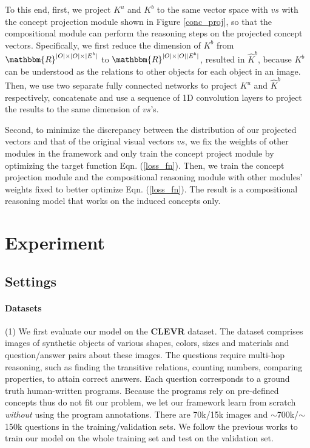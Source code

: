 \documentclass[10pt,twocolumn,letterpaper]{article}
\begin{document}
%
 
To this end, first, we project $K^u$ and $K^b$ to the same vector space with $vs$ with the concept projection module shown in Figure \ref{conc_proj}, so that the compositional module can perform the reasoning steps on the projected concept vectors.
Specifically, we first reduce the dimension of $K^b$ from $\mathbbm{R}^{|O| \times |O| \times |E^b|}$ to $\mathbbm{R}^{|O| \times |O||E^b|}$, resulted in $\hat{K}^b$, because $K^b$ can be understood as the relations to other objects for each object in an image. Then, we use two separate fully connected networks to project $K^u$ and $\hat{K}^b$ respectively, concatenate and use a sequence of 1D convolution layers to project the results to the same dimension of $vs$'s. 

Second, to minimize the discrepancy between the distribution of our projected vectors and that of the original visual vectors $vs$, we fix the weights of other modules in the framework and only train the concept project module by optimizing the target function Eqn. (\ref{loss_fn}). Then, we train the concept projection module and the compositional reasoning module with other modules' weights fixed to better optimize Eqn. (\ref{loss_fn}). The result is a compositional reasoning model that works on the induced concepts only. 


\vspace{-3mm}
\section{Experiment}
\vspace{-2mm}
\subsection{Settings}
\vspace{-2mm}
\paragraph{Datasets}
(1) We first evaluate our model on the \textbf{CLEVR} \cite{johnson2017clevr} dataset. The dataset comprises images of synthetic objects of various shapes, colors, sizes and materials and question/answer pairs about these images. The questions require multi-hop reasoning, such as finding the transitive relations, counting numbers, comparing properties, to attain correct answers. 
Each question corresponds to a ground truth human-written programs.
Because the programs rely on pre-defined concepts thus do not fit our problem, we let our framework learn from scratch \emph{without} using the program annotations.
There are 70k/15k images and $\sim$700k/$\sim$150k questions in the training/validation sets. We follow the previous works \cite{yi2018neural,hudson2018compositional,mao2018neuro} to train our model on the whole training set and test on the validation set. 
\end{document}
